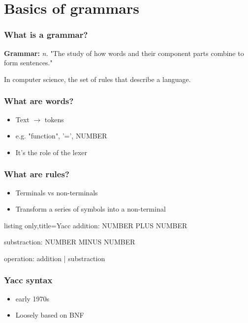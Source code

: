 \section{Basics of grammars}
\setcounter{subsection}{1}


\begin{frame}
  \frametitle{What is a grammar?}
  \textbf{Grammar:} \textit{n.} "The study of how words and their component
  parts combine to form sentences."

  In computer science, the set of rules that describe a language.
\end{frame}


\begin{frame}
  \frametitle{What are words?}
  \begin{itemize}
    \item Text $\rightarrow$ tokens
    \item e.g. "function", '=', NUMBER
    \item It's the role of the lexer
  \end{itemize}
\end{frame}


\begin{frame}[fragile]
  \frametitle{What are rules?}
  \begin{itemize}
    \item Terminals vs non-terminals
    \item Transform a series of symbols into a non-terminal
  \end{itemize}
\end{frame}

\begin{lrbox}{\codebox}
  \begin{tcblisting}{listing only,title=Yacc}
addition: NUMBER PLUS NUMBER

substraction: NUMBER MINUS NUMBER

operation:
  addition
| substraction
\end{tcblisting}
\end{lrbox}
\begin{frame}
\frametitle{Yacc syntax}
  \begin{itemize}
    \item early 1970s
    \item Loosely based on BNF
  \end{itemize}
  \usebox{\codebox}
\end{frame}
